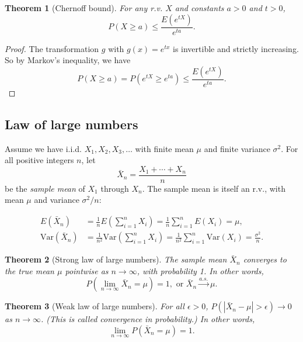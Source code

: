 \documentclass{./utils/mydoc}
\numberwithin{equation}{section} %
\newtheorem{theorem}{Theorem}[section]
\theoremstyle{definition}
\theoremstyle{remark}
\begin{document}
\begin{theorem}[Chernoff bound]
  For any r.v. $X$ and constants $a > 0$ and $t>0$,
  \begin{equation}
    P(X\ge a) \le \frac{E(e^{tX})}{e^{ta}}.
  \end{equation}
\end{theorem}
\begin{proof}
The transformation $g$ with $g(x) = e^{tx}$ is invertible and strictly increasing. So by Markov's inequality, we have
\[
P(X\ge a) = P(e^{tX} \ge e^{ta}) \le \frac{E(e^{tX})}{e^{ta}}.
\]
\end{proof}


\subsection{Law of large numbers}
Assume we have i.i.d. $X_1, X_2, X_3, \dots$  with finite mean $\mu$ and finite variance $\sigma^2$. For all positive integers $n$, let
\[
\bar{X}_n = \frac{X_1 + \cdots + X_n}{n}
\]
be the \emph{sample mean} of $X_1$ through $X_n$. The sample mean is itself an r.v., with mean $\mu$ and variance $\sigma^2/n$:

\[
\begin{split}
E(\bar{X}_n) &= \frac{1}{n} E\left(\sum_{i=1}^n X_i\right) 
= \frac{1}{n}\sum_{i=1}^n E(X_i) = \mu, \\
\text{Var}(\bar{X}_n) &= \frac{1}{n^2} \text{Var}\left(\sum_{i=1}^n X_i\right) 
= \frac{1}{n^2}\sum_{i=1}^n \text{Var}(X_i) = \frac{\sigma^2}{n}.
\end{split}
\]

\begin{theorem}[Strong law of large numbers]
  The sample mean $\bar{X}_n$ converges to the true mean $\mu$ pointwise as $n \to \infty$, with probability 1. In other words,
  \begin{equation}
  P(\lim_{n\to\infty} \bar{X}_n = \mu) = 1, \text{ or }
  \bar{X}_n \overset{a.s.}{\longrightarrow} \mu.
  \end{equation}
\end{theorem}

\begin{theorem}[Weak law of large numbers]
  For all $\epsilon >0$, $P(|\bar{X}_n-\mu|>\epsilon) \to 0$ as $n\to\infty$. (This is called \emph{convergence in probability}.) In other words,
  \begin{equation}
    \lim_{n\to\infty}P(\bar{X}_n = \mu) = 1.
  \end{equation}
\end{theorem}
\end{document}
